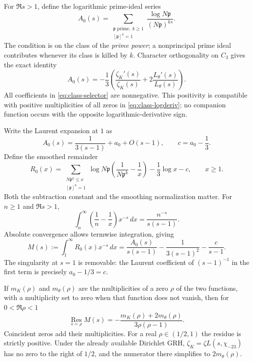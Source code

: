 For $\Re s>1$, define the logarithmic prime-ideal series
\begin{equation}\label{eq:class-selector}
 A_0(s)=
 \sum_{\substack{\mathfrak p\text{ prime},\ k\geq1\\
                         {[\mathfrak p]^k=1}}}
 \frac{\log N\mathfrak p}{(N\mathfrak p)^{ks}}.
\end{equation}
The condition is on the class of the \emph{prime power}; a nonprincipal
prime ideal contributes whenever its class is killed by $k$. Character
orthogonality on $C_3$ gives the exact identity
\begin{equation}\label{eq:class-logderiv}
 A_0(s)=-\frac13\left(
       \frac{\zeta_K'(s)}{\zeta_K(s)}
       +2\frac{L_\theta'(s)}{L_\theta(s)}\right).
\end{equation}
All coefficients in \eqref{eq:class-selector} are nonnegative. This
positivity is compatible with positive multiplicities of all zeros in
\eqref{eq:class-logderiv}; no companion function occurs with the opposite
logarithmic-derivative sign.

Write the Laurent expansion at $1$ as
\[
 A_0(s)=\frac{1}{3(s-1)}+a_0+O(s-1),\qquad c=a_0-\frac13.
\]
Define the smoothed remainder
\begin{equation}\label{eq:class-remainder}
 R_0(x)=
 \sum_{\substack{N\mathfrak p^k\leq x\\{[\mathfrak p]^k=1}}}
 \log N\mathfrak p\left(\frac1{N\mathfrak p^k}-\frac1x\right)
 -\frac13\log x-c,\qquad x\geq1.
\end{equation}
Both the subtraction constant and the smoothing normalization matter.
For $n\geq1$ and $\Re s>1$,
\[
 \int_n^\infty\left(\frac1n-\frac1x\right)x^{-s}\,dx
       =\frac{n^{-s}}{s(s-1)}.
\]
Absolute convergence allows termwise integration, giving
\begin{equation}\label{eq:class-mellin}
 M(s):=\int_1^\infty R_0(x)x^{-s}\,dx
  =\frac{A_0(s)}{s(s-1)}
       -\frac1{3(s-1)^2}-\frac{c}{s-1}.
\end{equation}
The singularity at $s=1$ is removable: the Laurent coefficient of
$(s-1)^{-1}$ in the first term is precisely $a_0-1/3=c$.

If $m_K(\rho)$ and $m_\theta(\rho)$ are the multiplicities of a zero
$\rho$ of the two functions, with a multiplicity set to zero when that
function does not vanish, then for $0<\Re\rho<1$
\begin{equation}\label{eq:class-residue}
 \operatorname*{Res}_{s=\rho} M(s)
 =-\frac{m_K(\rho)+2m_\theta(\rho)}{3\rho(\rho-1)}.
\end{equation}
Coincident zeros add their multiplicities. For a real
$\rho\in(1/2,1)$ the residue is strictly positive. Under the already
available Dirichlet GRH, $\zeta_K=\zeta L(s,\chi_{-23})$ has no zero
to the right of $1/2$, and the numerator there simplifies to
$2m_\theta(\rho)$.

